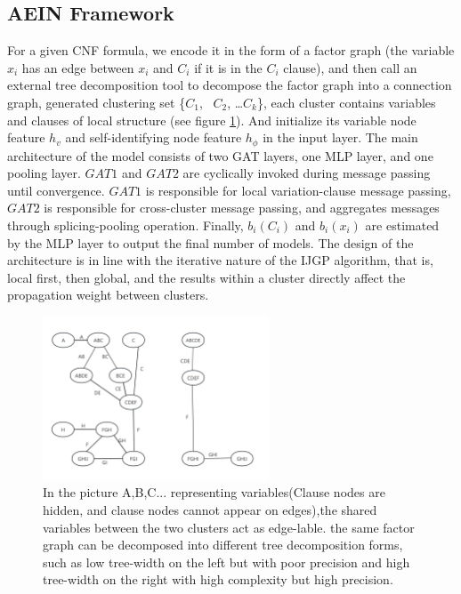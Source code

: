\subsection{AEIN Framework}
For a given CNF formula, we encode it in the form of a factor graph (the variable \(x_i\) has an edge between \(x_i\) and \(C_i\) if it is in the \(C_i\) clause), and then call an external tree decomposition tool to decompose the factor graph into a connection graph, generated clustering set \{\(C_1\), \ \(C_2\), \ldots \(C_k\)\}, each cluster contains variables and clauses of local structure (see figure \ref{fig2}). And initialize its variable node feature \(h_v\) and self-identifying node feature \(h_\phi\) in the input layer. The main architecture of the model consists of two GAT layers, one MLP layer, and one pooling layer. \(GAT1\) and \(GAT2\) are cyclically invoked during message passing until convergence. \(GAT1\) is responsible for local variation-clause message passing, \(GAT2\) is responsible for cross-cluster message passing, and aggregates messages through splicing-pooling operation. Finally, \(b_i(C_i)\) and \(b_i(x_i)\) are estimated by the MLP layer to output the final number of models. The design of the architecture is in line with the iterative nature of the IJGP algorithm, that is, local first, then global, and the results within a cluster directly affect the propagation weight between clusters.
\begin{figure}[h]
\centering 
\includegraphics[width=0.6\textwidth]{png/JG.png}
\caption{In the picture A,B,C... representing variables(Clause nodes are hidden, and clause nodes cannot appear on edges),the shared variables between the two clusters act as edge-lable. the same factor graph can be decomposed into different tree decomposition forms, such as low tree-width on the left but with poor precision and high tree-width on the right with high complexity but high precision.} 
\label{fig2}
\end{figure}
